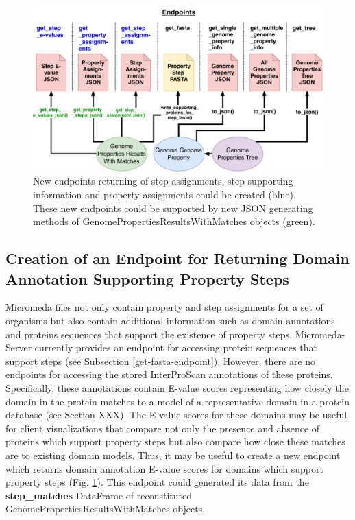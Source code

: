 \begin{figure}[!ht]
  \centering
	\includegraphics[width=\textwidth]{media/micromeda-server-new-endpoints.pdf}
	 \caption{New endpoints returning of step assignments, step supporting information and property assignments could be created (blue). These new endpoints could be supported by new JSON generating methods of GenomePropertiesResultsWithMatches objects (green).}
	 \label{fig:new_endpoints}
\end{figure}

\subsection{Creation of an Endpoint for Returning Domain Annotation Supporting Property Steps} \label{e-value-endpoint}

Micromeda files not only contain property and step assignments for a set of organisms but also contain additional information such as domain annotations and proteins sequences that support the existence of property steps. Micromeda-Server currently provides an endpoint for accessing protein sequences that support steps (see Subsection \ref{get-fasta-endpoint}). However, there are no endpoints for accessing the stored InterProScan annotations of these proteins. Specifically, these annotations contain E-value scores representing how closely the domain in the protein matches to a model of a representative domain in a protein database (see Section XXX). The E-value scores for these domains may be useful for client visualizations that compare not only the presence and absence of proteins which support property steps but also compare how close these matches are to existing domain models. Thus, it may be useful to create a new endpoint which returns domain annotation E-value scores for domains which support property steps (Fig. \ref{fig:new_endpoints}). This endpoint could generated its data from the \textbf{step\_matches} DataFrame of reconstituted GenomePropertiesResultsWithMatches objects.

